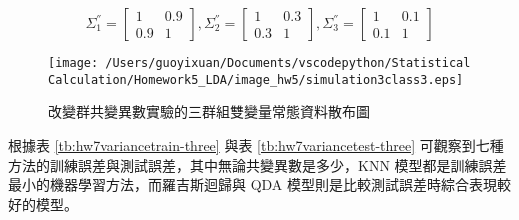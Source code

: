 $$ \Sigma_1^{''} = \left[
            \begin{array}{clr}
                1 & 0.9  \\
                0.9 & 1
            \end{array} \right] ,
            \Sigma_2^{''} = \left[
            \begin{array}{clr}
                1 & 0.3  \\
                0.3 & 1 
            \end{array} \right]  ,
            \Sigma_3^{''} = \left[
            \begin{array}{clr}
                1 & 0.1  \\
                0.1 & 1 
            \end{array} \right] $$
            
            
\begin{figure}[H]
    \centering
        \texttt{[image: /Users/guoyixuan/Documents/vscodepython/Statistical Calculation/Homework5\_LDA/image\_hw5/simulation3class3.eps]}
    \caption{改變群共變異數實驗的三群組雙變量常態資料散布圖}
    \label{fig:hw7variance-three}
\end{figure} 

\renewcommand\arraystretch{1.5}
\begin{table}[H]
\scriptsize
\setlength{\belowcaptionskip}{0pt}
\centering
\caption{七種機器學習方法改變群共變異數的三群組訓練資料分類錯誤率}\label{tb:hw7variancetrain-three}
\end{table}

根據表 \ref{tb:hw7variancetrain-three} 與表 \ref{tb:hw7variancetest-three} 可觀察到七種方法的訓練誤差與測試誤差，其中無論共變異數是多少，KNN 模型都是訓練誤差最小的機器學習方法，而羅吉斯迴歸與 QDA 模型則是比較測試誤差時綜合表現較好的模型。

